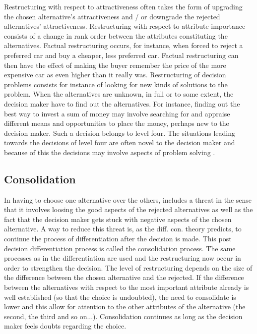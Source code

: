 \documentclass[jou,11pt]{apa6}
\begin{document}
 Restructuring with respect to attractiveness often takes the form of
 upgrading the chosen alternative's attractiveness and / or downgrade
 the rejected alternatives' attractiveness.  Restructuring with
 respect to attribute importance consists of a change in rank order
 between the attributes constituting the alternatives.  Factual
 restructuring occurs, for instance, when forced to reject a preferred
 car and buy a cheaper, less preferred car.  Factual restructuring can
 then have the effect of making the buyer remember the price of the
 more expensive car as even higher than it really was.  Restructuring
 of decision problems consists for instance of looking for new kinds
 of solutions to the problem.  When the alternatives are unknown, in
 full or to some extent, the decision maker have to find out the
 alternatives.  For instance, finding out the best way to invest a sum
 of money may involve searching for and appraise different means and
 opportunities to place the money, perhaps new to the decision maker.
 Such a decision belongs to level four.  The situations leading
 towards the decisions of level four are often novel to the decision
 maker and because of this the decisions may involve aspects of
 problem solving \parencite{svensson92b}.


\subsection{Consolidation}

In having to choose one alternative over the others, includes a threat
in the sense that it involves loosing the good aspects of the rejected
alternatives as well as the fact that the decision maker gets stuck
with negative aspects of the chosen alternative.  A way to reduce this
threat is, as the diff. con. theory predicts, to continue the process
of differentiation after the decision is made.  This post decision
differentiation process is called the consolidation process.  The same
processes as in the differentiation are used and the restructuring now
occur in order to strengthen the decision.  The level of restructuring
depends on the size of the difference between the chosen alternative
and the rejected.  If the difference between the alternatives with
respect to the most important attribute already is well established
(so that the choice is undoubted), the need to consolidate is lower
and this allow for attention to the other attributes of the
alternative (the second, the third and so on...).  Consolidation
continues as long as the decision maker feels doubts regarding the
choice.
\end{document}
